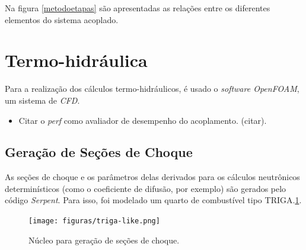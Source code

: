 Na figura \ref{metodoetapas} são apresentadas as relações entre os diferentes elementos
do sistema acoplado.



\section{Termo-hidráulica}
\label{sec:th}

Para a realização dos cálculos termo-hidráulicos, é usado o \textit{software OpenFOAM},
um sistema de \textit{CFD}.

\begin{itemize}
  \item Citar o \textit{perf} como avaliador de desempenho do acoplamento. (citar).
\end{itemize}

\subsection{Geração de Seções de Choque}
\label{sub:xs}

As seções de choque e os parâmetros delas derivados para os cálculos neutrônicos
determinísticos (como o coeficiente de difusão, por exemplo) são gerados pelo
código \textit{Serpent}.
Para isso, foi modelado um quarto de combustível tipo TRIGA.\ref{mini-triga}.

\begin{figure}[htb]
  \caption{Núcleo para geração de seções de choque.}
  \centering\texttt{[image: figuras/triga-like.png]}
  \label{mini-triga}
\end{figure}




